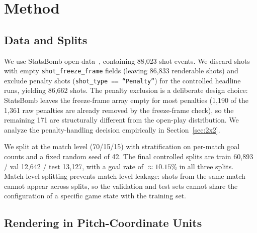 \documentclass[runningheads,a4paper]{llncs}
\begin{document}

\section{Method}
\label{sec:method}

\subsection{Data and Splits}
\label{sec:data}

We use StatsBomb open-data~\cite{statsbomb_opendata}, containing 88{,}023
shot events. We discard shots with empty
\texttt{shot\_freeze\_frame} fields (leaving 86{,}833 renderable shots)
and exclude penalty shots (\texttt{shot\_type == ``Penalty''}) for the
controlled headline runs, yielding 86{,}662 shots. The penalty exclusion
is a deliberate design choice: StatsBomb leaves the freeze-frame array
empty for most penalties (1{,}190 of the 1{,}361 raw penalties are
already removed by the freeze-frame check), so the remaining 171 are
structurally different from the open-play distribution. We analyze the
penalty-handling decision empirically in Section~\ref{sec:2x2}.

We split at the match level (70/15/15) with stratification on per-match
goal counts and a fixed random seed of 42. The final controlled splits
are train 60{,}893 / val 12{,}642 / test 13{,}127, with a goal rate of
$\approx 10.15\%$ in all three splits. Match-level splitting prevents
match-level leakage: shots from the same match cannot appear across
splits, so the validation and test sets cannot share the configuration
of a specific game state with the training set.

\subsection{Rendering in Pitch-Coordinate Units}
\label{sec:rendering}
\end{document}
